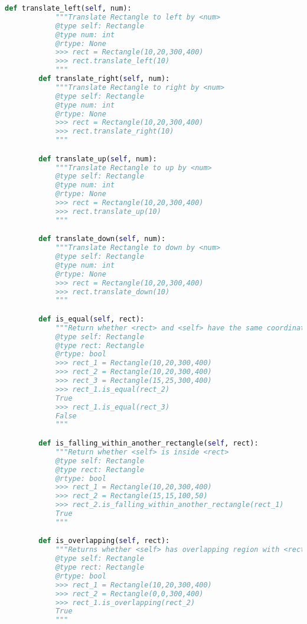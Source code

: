 \documentclass[12pt]{article}
\begin{document}
\begin{enumerate}
\begin{lstlisting}[language=Python]
        def translate_left(self, num):
            """Translate Rectangle to left by <num>
            @type self: Rectangle
            @type num: int
            @rtype: None
            >>> rect = Rectangle(10,20,300,400)
            >>> rect.translate_left(10)
            """
        def translate_right(self, num):
            """Translate Rectangle to right by <num>
            @type self: Rectangle
            @type num: int
            @rtype: None
            >>> rect = Rectangle(10,20,300,400)
            >>> rect.translate_right(10)
            """

        def translate_up(self, num):
            """Translate Rectangle to up by <num>
            @type self: Rectangle
            @type num: int
            @rtype: None
            >>> rect = Rectangle(10,20,300,400)
            >>> rect.translate_up(10)
            """

        def translate_down(self, num):
            """Translate Rectangle to down by <num>
            @type self: Rectangle
            @type num: int
            @rtype: None
            >>> rect = Rectangle(10,20,300,400)
            >>> rect.translate_down(10)
            """

        def is_equal(self, rect):
            """Return whether <rect> and <self> have the same coordinate and size
            @type self: Rectangle
            @type rect: Rectangle
            @rtype: bool
            >>> rect_1 = Rectangle(10,20,300,400)
            >>> rect_2 = Rectangle(10,20,300,400)
            >>> rect_3 = Rectangle(15,25,300,400)
            >>> rect_1.is_equal(rect_2)
            True
            >>> rect_1.is_equal(rect_3)
            False
            """

        def is_falling_within_another_rectangle(self, rect):
            """Return whether <self> is inside <rect>
            @type self: Rectangle
            @type rect: Rectangle
            @rtype: bool
            >>> rect_1 = Rectangle(10,20,300,400)
            >>> rect_2 = Rectangle(15,15,100,50)
            >>> rect_2.is_falling_within_another_rectangle(rect_1)
            True
            """

        def is_overlapping(self, rect):
            """Returns whether <self> has overlapping region with <rect>
            @type self: Rectangle
            @type rect: Rectangle
            @rtype: bool
            >>> rect_1 = Rectangle(10,20,300,400)
            >>> rect_2 = Rectangle(0,0,300,400)
            >>> rect_1.is_overlapping(rect_2)
            True
            """
    \end{lstlisting}


\end{enumerate}
\end{document}
